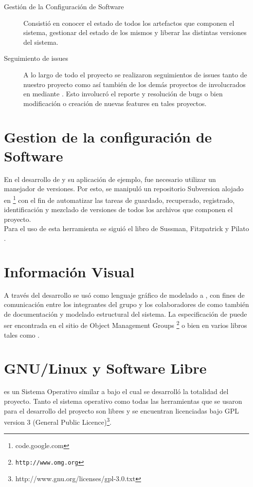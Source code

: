 \begin{description}
    \item[Gestión de la Configuración de Software]
Consistió en conocer el estado de todos los artefactos que componen el sistema, gestionar del estado
de los mismos y liberar las distintas versiones del sistema.

    \item[Seguimiento de issues]
A lo largo de todo el proyecto se realizaron seguimientos de issues tanto de nuestro proyecto como así también de los demás
proyectos de \fude{} involucrados en \rc{} mediante \gc{}. Esto involucró el reporte y resolución de bugs o bien modificación o creación
de nuevas features en tales proyectos.

\end{description}

\section{Gestion de la configuración de Software}
En el desarrollo de \rc{} y su aplicación de ejemplo, fue necesario utilizar un manejador de versiones. Por esto, se manipuló un
repositorio Subversion alojado en \gc{} \footnote{code.google.com} con el fin de automatizar las tareas de guardado, recuperado, registrado,
identificación y mezclado de versiones de todos los archivos que componen el proyecto.\\

Para el uso de esta herramienta se siguió el libro de Sussman, Fitzpatrick y Pilato \cite{svn}.

\section{Información Visual}
A través del desarrollo se usó como lenguaje gráfico de modelado a \uml, con fines de comunicación entre los integrantes del grupo y los
colaboradores de \fude{} como también de documentación y modelado estructural del sistema. La especificación de \uml{} puede ser encontrada
en el sitio de Object Management Groups \footnote{\texttt{http://www.omg.org}} o bien en varios libros tales como \cite{uml}.

\section{GNU/Linux y Software Libre}
\linux{} es un Sistema Operativo similar a \unix{} bajo el cual se desarrolló la totalidad del proyecto. Tanto el sistema operativo como
todas las herramientas que se usaron para el desarrollo del proyecto son libres y se encuentran licenciadas
bajo GPL version 3 (General Public Licence)\footnote{http://www.gnu.org/licenses/gpl-3.0.txt}.

